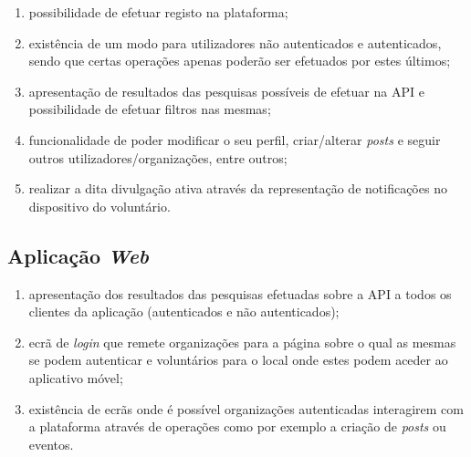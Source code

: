 \begin{enumerate}
	\item possibilidade de efetuar registo na plataforma;
	\item existência de um modo para utilizadores não autenticados e autenticados, sendo que certas operações apenas poderão ser efetuados por estes últimos;
	\item apresentação de resultados das pesquisas possíveis de efetuar na API e possibilidade de efetuar filtros nas mesmas;
	\item funcionalidade de poder modificar o seu perfil, criar/alterar \textit{posts} e seguir outros utilizadores/organizações, entre outros;
	\item realizar a dita divulgação ativa através da representação de notificações no dispositivo do voluntário.
\end{enumerate}

\subsection*{Aplicação \textit{Web}}

\begin{enumerate}
	\item apresentação dos resultados das pesquisas efetuadas sobre a API a todos os clientes da aplicação (autenticados e não autenticados);
	\item ecrã de \textit{login} que remete organizações para a página sobre o qual as mesmas se podem autenticar e voluntários para o local onde estes podem aceder ao aplicativo móvel;
	\item existência de ecrãs onde é possível organizações autenticadas interagirem com a plataforma através de operações como por exemplo a criação de \textit{posts} ou eventos.
\end{enumerate}